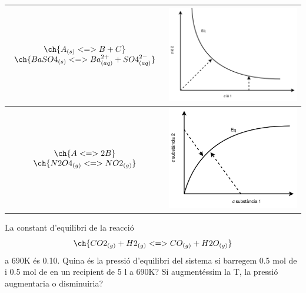 \begin{table}[h!]
\begin{center}
\begin{tabular}{c|c}
$\begin{array}{c}\ch{A_{(s)} <=> B + C} \\ \ch{BaSO4_{(s)} <=>  Ba^{2+}_{(aq)} + SO4^{2-}_{(aq)}}\end{array}$ & \includegraphics[scale=0.3]{figures/Eq3.png} \\\hline
$\begin{array}{c}\ch{A <=> 2B} \\ \ch{N2O4_{(g)} <=> NO2_{(g)}}\end{array}$ & \includegraphics[scale=0.4]{figures/Eq4.png} \\
      \hline
    \end{tabular}
  \end{center}
\end{table}

\begin{exr}
La constant d'equilibri de la reacció
\[
\ch{CO2_{(g)} + H2_{(g)} <=> CO_{(g)} + H2O_{(g)}}
\]
a 690K és 0.10. Quina és la pressió d'equilibri del sistema si barregem 0.5 mol de  i 0.5 mol de  en un recipient de 5 l a 690K?
Si augmentéssim la T, la pressió augmentaria o disminuiria?
\end{exr}

